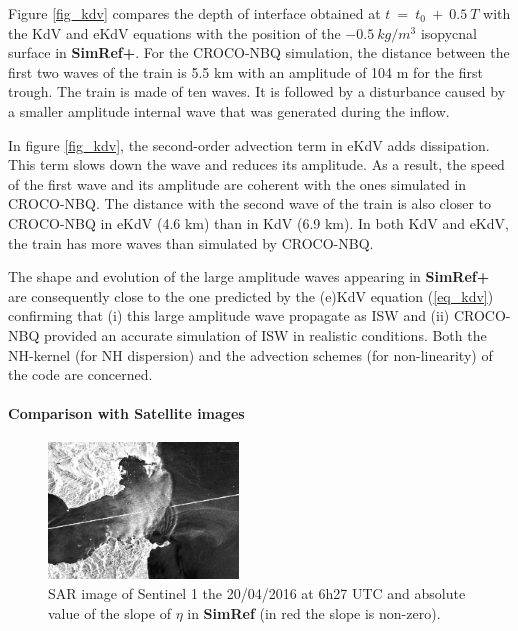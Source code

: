 Figure \ref{fig_kdv} compares the depth of interface obtained at $t\ =\ t_0\ +\ 0.5\ T$ with the KdV and eKdV equations with the position of the $-0.5\ kg/m^3$ isopycnal surface in \textbf{SimRef+}. For the CROCO-NBQ simulation, the distance between the first two waves of the train is 5.5 km with an amplitude of 104 m for the first trough. The train is made of ten waves. It is followed by a disturbance caused by a smaller amplitude internal wave that was generated during the inflow.

In figure \ref{fig_kdv}, the second-order advection term in eKdV adds dissipation. This term slows down the wave and reduces its amplitude. As a result, the speed of the first wave and its amplitude are coherent with the ones simulated in CROCO-NBQ. The distance with the second wave of the train is also closer to CROCO-NBQ in eKdV (4.6 km) than in KdV (6.9 km). In both KdV and eKdV, the train has more waves than simulated by CROCO-NBQ.

The shape and evolution of the large amplitude waves appearing in \textbf{SimRef+} are consequently close to the one predicted by the (e)KdV equation (\ref{eq_kdv}) confirming that (i) this large amplitude wave propagate as ISW and (ii) CROCO-NBQ provided an accurate simulation of ISW in realistic conditions. Both the NH-kernel (for NH dispersion) and the advection schemes (for non-linearity) of the code are concerned.\\


\paragraph{Comparison with Satellite images}
\begin{figure}[!h]
 \centering
 \includegraphics[width=0.45\textwidth]{./papier2D/sat_2dref_20042016_zoom.png}
 \caption{SAR image of Sentinel 1 the 20/04/2016 at 6h27 UTC and absolute value of the slope of $\eta$ in \textbf{SimRef} (in red the slope is non-zero). }
 \label{sat2d}
\end{figure}

